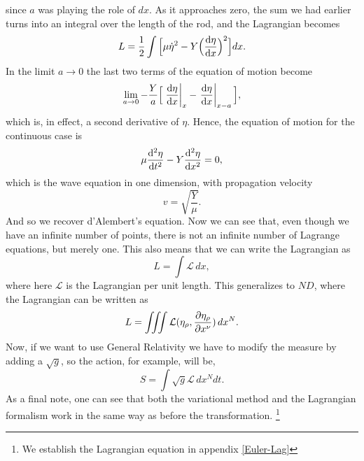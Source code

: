 \documentclass{article}
\begin{document}
since $a$ was playing the role of $dx$. As it approaches zero, the sum we had earlier turns into an integral over the length of the rod, and the Lagrangian
becomes
\begin{equation}
    L = \frac{1}{2} \int \Big[ \mu \dot{\eta}^2 - Y\Big(\dv{\eta}{x}\Big)^2 \Big] dx.
\end{equation}
In the limit $a \rightarrow 0$ the last two terms of the equation of motion become
\begin{equation*}
    \lim_{a \rightarrow 0} - \frac{Y}{a} \Big[ \left.\dv{\eta}{x} \right|_x - \left.\dv{\eta}{x}\right|_{x-a} \Big],
\end{equation*}
which is, in effect, a second derivative of $\eta$. Hence, the equation of motion for the continuous case is
\begin{equation}
    \mu \dv[2]{\eta}{t} - Y \dv[2]{\eta}{x} = 0,
\end{equation}
which is the wave equation in one dimension, with propagation velocity
\begin{equation*}
    v = \sqrt{\frac{Y}{\mu}}.
\end{equation*}
And so we recover d'Alembert's equation.
Now we can see that, even though we have an infinite number of points, there is not an infinite number of Lagrange equations, but merely one.
This also means that we can write the Lagrangian as
\begin{equation*}
    L = \int\mathcal{L} \, dx,
\end{equation*}
where here $\mathcal{L}$ is the Lagrangian per unit length. This generalizes to $ND$, where
the Lagrangian can be written as
\begin{equation} \label{densitylagrandef}
    L = \iiint \mathcal{L}(\eta_{\rho},\pdv{\eta_{\rho}}{x^{\nu}}) \, dx^N.
\end{equation}
Now, if we want to use General Relativity we have to modify the measure by adding a $\sqrt{g}$, so the action, for example, will be,
\begin{equation} \label{actiondensitylag}
    S = \int \sqrt{g} \mathcal{L} \, dx^{N}dt.
\end{equation}
As a final note, one can see that both the variational method and the Lagrangian formalism work in the same way as before the transformation. \footnote{We establish the Lagrangian equation in appendix \ref{Euler-Lag}}
\end{document}
